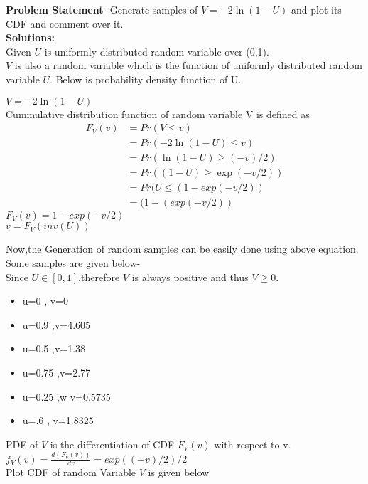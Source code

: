 \documentclass[journal,12pt,twocoloums]{IEEEtran}
\begin{document}
 \maketitle
 
 \textbf{Problem Statement}- Generate samples of
$V=-2 \ln (1-U)$ and plot its CDF and comment over it.\\
\textbf{Solutions:}\\
Given $U$ is uniformly distributed random variable over \in (0,1). \\




$V$ is also a  random variable which is the function of uniformly distributed random variable $U$. 
Below is probability density function of U. 

$V = -2 \ln(1-U)$\\
Cummulative distribution function of random variable V is defined as \\
\begin{align*}
    F_V(v) &= Pr(V \le v) \\
           &= Pr( -2 \ln(1-U)\le v) \\
           &= Pr(\ln(1-U) \ge( -v) /2)\\
           &= Pr ((1-U) \ge \exp(-v/2))\\
           &= Pr(U \le (1- exp(-v/2))\\
           &=  (1-(exp(-v/2))
\end{align*}
$F_V(v) = 1- exp(-v/2)$\\
$ v = F_V(inv(U))$


Now,the Generation of random samples can be easily done using above equation. Some samples are given below-\\
Since $U \in [0,1]$,therefore $V$ is always positive and thus $V \ge 0$.
\begin{itemize}
\item 
u=0 , v=0
    \item 
 u=0.9 ,v=4.605
 \item
 u=0.5 ,v=1.38
 \item
 u=0.75 ,v=2.77
 \item
 u=0.25 ,w v=0.5735
 \item
 u=.6 , v=1.8325
\end{itemize}
PDF of $V$ is the differentiation of CDF $F_V(v)$ with respect to v. 
$ f_V(v) = \frac{d (F_V (v) )}{dv} 
= exp((-v)/2)/2$\\
Plot CDF of random Variable $V$ is given below
\end{document}
